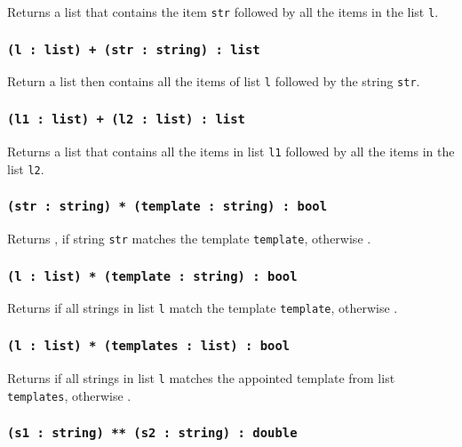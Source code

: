 Returns a list that contains the item \texttt{str} followed by all the items in the list \texttt{l}.

\subsubsection{\texttt{(l : list) + (str : string) : list}}

Return a list then contains all the items of list \texttt{l} followed by the string \texttt{str}.

\subsubsection{\texttt{(l1 : list) + (l2 : list) : list}}

Returns a list that contains all the items in list \texttt{l1} followed by all the items in the list \texttt{l2}.

\subsubsection{\texttt{(str : string) * (template : string) : bool}}

Returns \true{}, if string \texttt{str} matches the template \texttt{template}, otherwise \false{}.

\subsubsection{\texttt{(l : list) * (template : string) : bool}}

Returns \true{} if all strings in list \texttt{l} match the template \texttt{template}, otherwise \false{}.

\subsubsection{\texttt{(l : list) * (templates : list) : bool}}

Returns \true{} if all strings in list \texttt{l} matches the appointed template from list \texttt{templates}, otherwise \false{}.

\subsubsection{\texttt{(s1 : string) ** (s2 : string) : double}}

